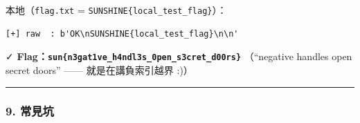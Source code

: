\documentclass[10pt,a4paper]{article}
\begin{document}
本地（\texttt{flag.\allowbreak{}txt} = \texttt{SUNSHINE\{\allowbreak{}local\_\allowbreak{}test\_\allowbreak{}flag\}\allowbreak{}}）：

\begin{Verbatim}[breaklines=true,breakanywhere=true,breakautoindent=false,fontsize=\fontsize{7.0}{9.5}\selectfont]
[+] raw  : b'OK\nSUNSHINE{local_test_flag}\n\n'
\end{Verbatim}

✓ \textbf{Flag：\texttt{sun\{\allowbreak{}n3gat1ve\_\allowbreak{}h4ndl3s\_\allowbreak{}0pen\_\allowbreak{}s3cret\_\allowbreak{}d00rs\}\allowbreak{}}}
（``negative handles open secret doors'' ------ 就是在講負索引越界 :)）

\begin{center}\rule{0.5\linewidth}{0.5pt}\end{center}

\subsubsection{9. 常見坑}\label{ux5e38ux898bux5751-1}
\end{document}
